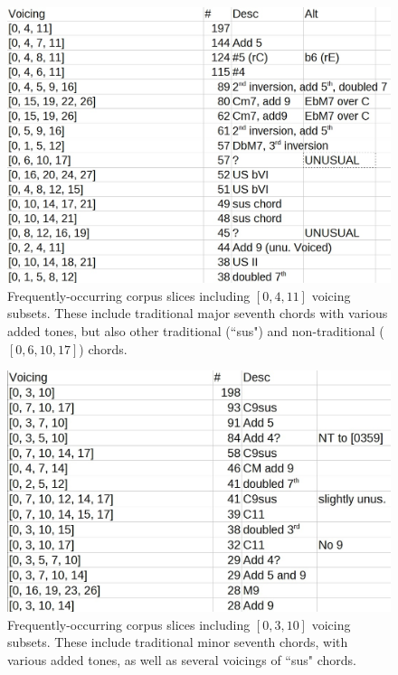 \begin{figure}%
	\centering
	\includegraphics[width=5in]{0411_tones.jpg}
	\caption{Frequently-occurring corpus slices including $[0,4,11]$ voicing subsets.  These include traditional major seventh chords with various added tones, but also other traditional (``sus") and non-traditional ($[0,6,10,17]$) chords.}
	\label{[0,4,11]}
\end{figure}

\begin{figure}%
	\centering
	\includegraphics[width=5in]{0310_tones.jpg}
	\caption{Frequently-occurring corpus slices including $[0,3,10]$ voicing subsets.  These include traditional minor seventh chords, with various added tones, as well as several voicings of ``sus" chords.}
	\label{[0,3,10]}
\end{figure}

